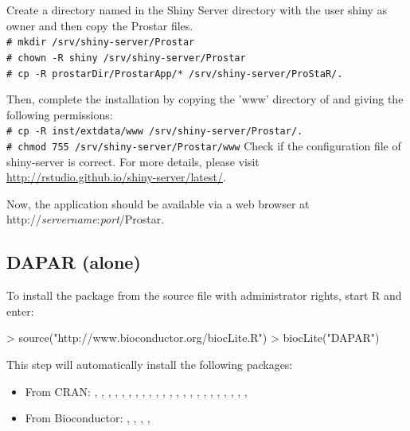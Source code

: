 \documentclass[12pt]{article}
\newcommand{\shellcmd}[1]{\\\indent\indent\texttt{\footnotesize\# #1}}
\begin{document}
Create a directory named  in the Shiny Server directory with 
the user shiny as owner and then copy the Prostar files.\newline
\shellcmd{mkdir /srv/shiny-server/Prostar}
\shellcmd{chown -R shiny /srv/shiny-server/Prostar}
\shellcmd{cp -R prostarDir/ProstarApp/* /srv/shiny-server/ProStaR/.}

Then, complete the installation by copying the 'www' directory of 
 and giving the following permissions:\newline
\shellcmd{cp -R inst/extdata/www /srv/shiny-server/Prostar/.}
\shellcmd{chmod 755 /srv/shiny-server/Prostar/www}\newline
\newline
Check if the configuration file of shiny-server is correct.\newline
For more details, please visit 
\url{http://rstudio.github.io/shiny-server/latest/}.

Now, the application should be available via a web browser at 
http://\emph{servername}:\emph{port}/Prostar.



\subsection{DAPAR (alone)}\label{sec:daparalone}


To install the package  from the source file with administrator 
rights, start R and enter:

\begin{Schunk}
\begin{Sinput}
> source("http://www.bioconductor.org/biocLite.R")
> biocLite("DAPAR")
\end{Sinput}
\end{Schunk}

This step will automatically install the following packages:
\begin{itemize}
\item {From CRAN}: , , , 
, , , , 
, , , ,
, , , ,
, , , 
, , , , 
, 
\item {From Bioconductor}: , , 
, , 
\end{itemize}
\end{document}
